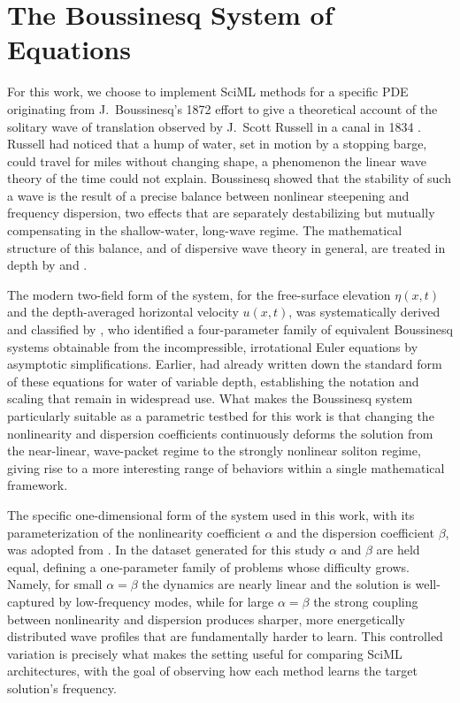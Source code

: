 \section{The Boussinesq System of Equations}

For this work, we choose to implement SciML methods for a specific PDE originating from J.~Boussinesq's 1872 effort to give a theoretical account of the solitary wave of translation observed by J.~Scott Russell in a canal in 1834 \parencite{boussinesq1872}. Russell had noticed that a hump of water, set in motion by a stopping barge, could travel for miles without changing shape, a phenomenon the linear wave theory of the time could not explain. Boussinesq showed that the stability of such a wave is the result of a precise balance between nonlinear steepening and frequency dispersion, two effects that are separately destabilizing but mutually compensating in the shallow-water, long-wave regime. The mathematical structure of this balance, and of dispersive wave theory in general, are treated in depth by \textcite{whitham1974} and \textcite{debnath2012}.

The modern two-field form of the system, for the free-surface elevation $\eta(x,t)$ and the depth-averaged horizontal velocity $u(x,t)$, was systematically derived and classified by \textcite{bona2002}, who identified a four-parameter family of equivalent Boussinesq systems obtainable from the incompressible, irrotational Euler equations by asymptotic simplifications. Earlier, \textcite{peregrine1967} had already written down the standard form of these equations for water of variable depth, establishing the notation and scaling that remain in widespread use. What makes the Boussinesq system particularly suitable as a parametric testbed for this work is that changing the nonlinearity and dispersion coefficients continuously deforms the solution from the near-linear, wave-packet regime to the strongly nonlinear soliton regime, giving rise to a more interesting range of behaviors within a single mathematical framework.

The specific one-dimensional form of the system used in this work, with its parameterization of the nonlinearity coefficient $\alpha$ and the dispersion coefficient $\beta$, was adopted from \textcite{martins2023, martins2024}. In the dataset generated for this study $\alpha$ and $\beta$ are held equal, defining a one-parameter family of problems whose difficulty grows. Namely, for small $\alpha = \beta$ the dynamics are nearly linear and the solution is well-captured by low-frequency modes, while for large $\alpha = \beta$ the strong coupling between nonlinearity and dispersion produces sharper, more energetically distributed wave profiles that are fundamentally harder to learn. This controlled variation is precisely what makes the setting useful for comparing SciML architectures, with the goal of observing how each method learns the target solution's frequency.

